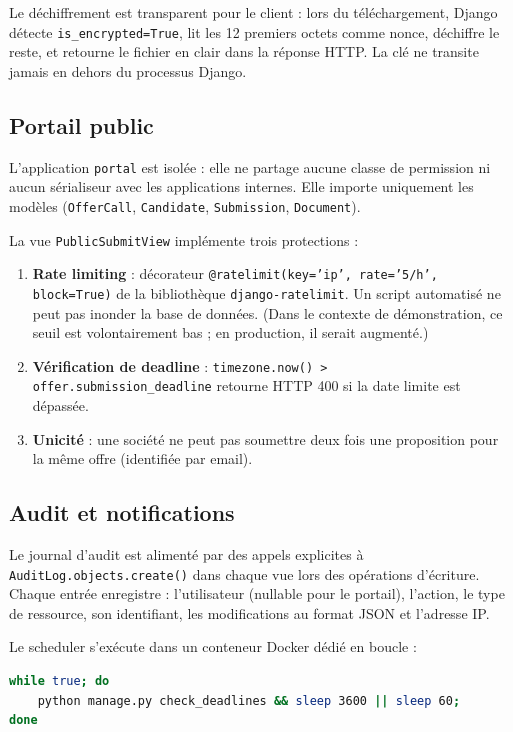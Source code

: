 Le déchiffrement est transparent pour le client : lors du téléchargement, Django détecte \texttt{is\_encrypted=True}, lit les 12 premiers octets comme nonce, déchiffre le reste, et retourne le fichier en clair dans la réponse HTTP. La clé ne transite jamais en dehors du processus Django.

\subsection{Portail public}

L'application \texttt{portal} est isolée : elle ne partage aucune classe de permission ni aucun sérialiseur avec les applications internes. Elle importe uniquement les modèles (\texttt{OfferCall}, \texttt{Candidate}, \texttt{Submission}, \texttt{Document}).

La vue \texttt{PublicSubmitView} implémente trois protections :

\begin{enumerate}
    \item \textbf{Rate limiting} : décorateur \texttt{@ratelimit(key='ip', rate='5/h', block=True)} de la bibliothèque \texttt{django-ratelimit}. Un script automatisé ne peut pas inonder la base de données. (Dans le contexte de démonstration, ce seuil est volontairement bas ; en production, il serait augmenté.)
    \item \textbf{Vérification de deadline} : \texttt{timezone.now() > offer.submission\_deadline} retourne HTTP 400 si la date limite est dépassée.
    \item \textbf{Unicité} : une société ne peut pas soumettre deux fois une proposition pour la même offre (identifiée par email).
\end{enumerate}

\subsection{Audit et notifications}

Le journal d'audit est alimenté par des appels explicites à \texttt{AuditLog.objects.create()} dans chaque vue lors des opérations d'écriture. Chaque entrée enregistre : l'utilisateur (nullable pour le portail), l'action, le type de ressource, son identifiant, les modifications au format JSON et l'adresse IP.

Le scheduler s'exécute dans un conteneur Docker dédié en boucle :

\begin{lstlisting}[style=PythonStyle, language=bash, caption={Boucle du scheduler}]
while true; do
    python manage.py check_deadlines && sleep 3600 || sleep 60;
done
\end{lstlisting}

